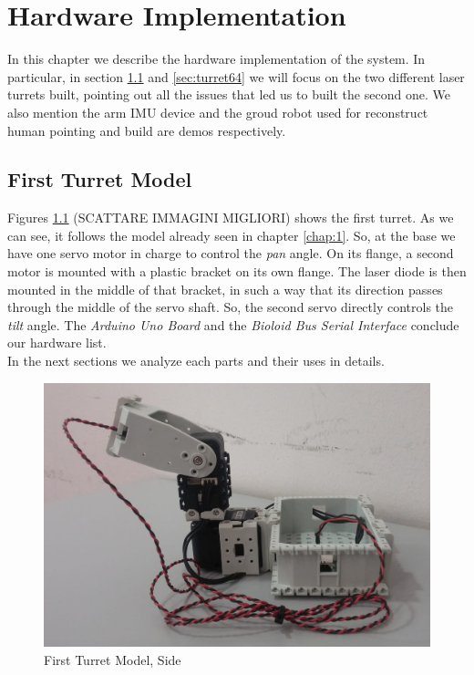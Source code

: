 \chapter{Hardware Implementation}
\label{chap:2}
In this chapter we describe the hardware implementation of the system. In particular, in section \ref{sec:turret12} and \ref{sec:turret64} we will focus on the two different laser turrets built, pointing out all the issues that led us to built the second one. We also mention the arm IMU device and the groud robot used for reconstruct human pointing and build are demos respectively.
\section{First Turret Model} \label{sec:turret12}
Figures \ref{fig:firstModelSide} (SCATTARE IMMAGINI MIGLIORI) shows the first turret. As we can see, it follows the model already seen in chapter \ref{chap:1}. So, at the base we have one servo motor in charge to control the \emph{pan} angle. On its flange, a second motor is mounted with a plastic bracket on its own flange. The laser diode is then mounted in the middle of that bracket, in such a way that its direction passes through the middle of the servo shaft. So, the second servo directly controls the \emph{tilt} angle. 
The \emph{Arduino Uno Board} and the \emph{Bioloid Bus Serial Interface} conclude our hardware list.
\\In the next sections we analyze each parts and their uses in details.
\begin{figure}
	\centering
	\includegraphics[width=\textwidth]{img/firstModelSide.png}%
	\caption{First Turret Model, Side}
	\label{fig:firstModelSide}
\end{figure}
